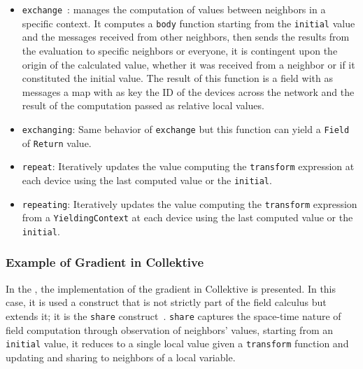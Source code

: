 \begin{itemize}
    \item \texttt{exchange}~\cite{https://doi.org/10.4230/lipics.ecoop.2022.20}: manages the computation of values between neighbors in a specific context. It computes a \texttt{body} function starting from the \texttt{initial} value and the messages received from other neighbors, then sends the results from the evaluation to specific neighbors or everyone, it is contingent upon the origin of the calculated value, whether it was received from a neighbor or if it constituted the initial value. The result of this function is a field with as messages a map with as key the ID of the devices across the network and the result of the computation passed as relative local values.
    \item \texttt{exchanging}: Same behavior of \texttt{exchange} but this function can yield a \texttt{Field} of \texttt{Return} value.
    \item \texttt{repeat}: Iteratively updates the value computing the \texttt{transform} expression at each device using the last computed value or the \texttt{initial}.
    \item \texttt{repeating}: Iteratively updates the value computing the \texttt{transform} expression from a \texttt{YieldingContext} at each device using the last computed value or the \texttt{initial}.
\end{itemize}



\subsubsection{Example of Gradient in Collektive}

In the , the implementation of the gradient in Collektive is presented. In this case, it is used a construct that is not strictly part of the field calculus but extends it; it is the \texttt{share} construct~\cite{https://doi.org/10.48550/arxiv.1910.02874}. \texttt{share} captures the space-time nature of field computation through observation of neighbors' values, starting from an \texttt{initial} value, it reduces to a single local value given a \texttt{transform} function and updating and sharing to neighbors of a local variable.



